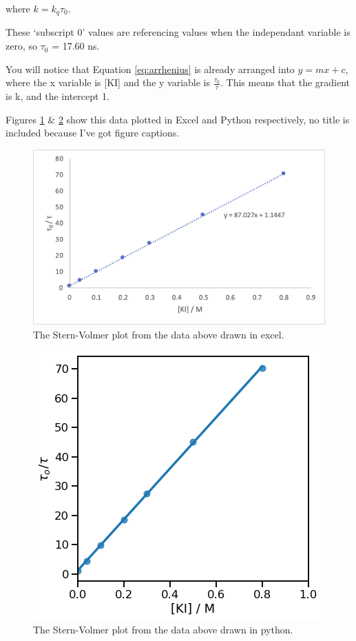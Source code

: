 \documentclass[
]{book}
\begin{document}
where \(k = k_q \tau_0\).

These `subscript 0' values are referencing values when the independant variable is zero, so \(\tau_0\) = 17.60 ns.

You will notice that Equation \eqref{eq:arrhenius} is already arranged into \(y=mx+c\), where the x variable is {[}KI{]} and the y variable is \(\frac{\tau_0}{\tau}\). This means that the gradient is k, and the intercept 1.

Figures \ref{fig:excel} \& \ref{fig:python} show this data plotted in Excel and Python respectively, no title is included because I've got figure captions.

\begin{figure}

{\centering \includegraphics[width=0.7\linewidth]{images/graphexcel} 

}

\caption{The Stern-Volmer plot from the data above drawn in excel.}\label{fig:excel}
\end{figure}

\begin{figure}

{\centering \includegraphics[width=0.5\linewidth]{images/graphpython} 

}

\caption{The Stern-Volmer plot from the data above drawn in python.}\label{fig:python}
\end{figure}
\end{document}
